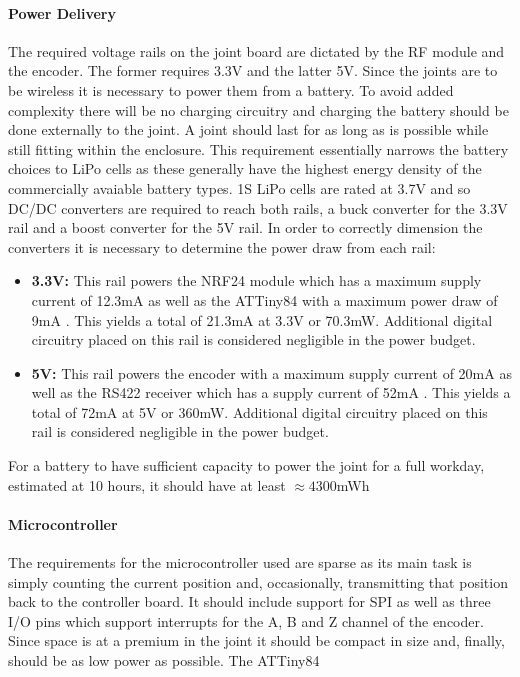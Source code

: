 \paragraph{Power Delivery} %
\label{par:power_delivery}
The required voltage rails on the joint board are dictated by the RF module and the encoder.
The former requires 3.3V and the latter 5V.
Since the joints are to be wireless it is necessary to power them from a battery.
To avoid added complexity there will be no charging circuitry and charging the battery should be done externally to the joint.
A joint should last for as long as is possible while still fitting within the enclosure.
This requirement essentially narrows the battery choices to LiPo cells as these generally have the highest energy density of the commercially avaiable battery types.
1S LiPo cells are rated at 3.7V and so DC/DC converters are required to reach both rails, a buck converter for the 3.3V rail and a boost converter for the 5V rail.
In order to correctly dimension the converters it is necessary to determine the power draw from each rail:
\begin{itemize}
 	\item \textbf{3.3V:} This rail powers the NRF24 module which has a maximum supply current of 12.3mA \cite{NFR24L01} as well as the ATTiny84 with a maximum power draw of 9mA \cite{attiny84}.
 	This yields a total of 21.3mA at 3.3V or 70.3mW.
 	Additional digital circuitry placed on this rail is considered negligible in the power budget.
 	\item \textbf{5V:} This rail powers the encoder with a maximum supply current of 20mA \cite{RLBD01} as well as the RS422 receiver which has a supply current of 52mA \cite{rs422rec}.
 	This yields a total of 72mA at 5V or 360mW.
 	Additional digital circuitry placed on this rail is considered negligible in the power budget.
\end{itemize}
For a battery to have sufficient capacity to power the joint for a full workday, estimated at 10 hours, it should have at least $\approx4300$mWh
\paragraph{Microcontroller} %
\label{par:microcontroller}
The requirements for the microcontroller used are sparse as its main task is simply counting the current position and, occasionally, transmitting that position back to the controller board.
It should include support for SPI as well as three I/O pins which support interrupts for the A, B and Z channel of the encoder.
Since space is at a premium in the joint it should be compact in size and, finally, should be as low power as possible.
The ATTiny84 \cite{attiny84}
